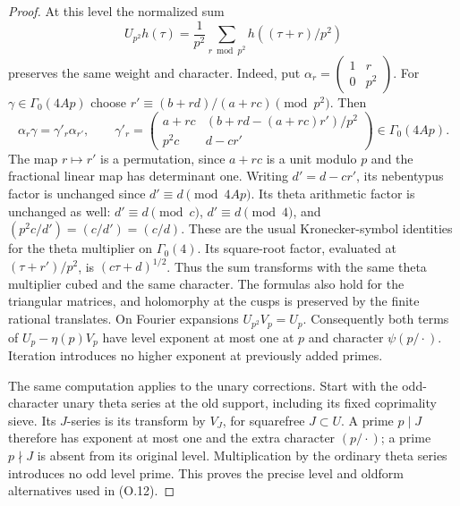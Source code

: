 \documentclass[11pt]{article}
\theoremstyle{definition}
\theoremstyle{remark}
\begin{document}
\begin{proof}
At this level the normalized sum
\[
 U_{p^2}h(\tau)=\frac1{p^2}\sum_{r\bmod p^2}
                             h((\tau+r)/p^2)
\]
preserves the same weight and character. Indeed, put
$\alpha_r=\left(\begin{smallmatrix}1&r\\0&p^2\end{smallmatrix}\right)$.
For $\gamma\in\Gamma_0(4Ap)$ choose
$r'\equiv(b+rd)/(a+rc)\pmod{p^2}$. Then
\[
 \alpha_r\gamma=\gamma'_r\alpha_{r'},\qquad
 \gamma'_r=
 \begin{pmatrix}
  a+rc&(b+rd-(a+rc)r')/p^2\\
  p^2c&d-cr'
 \end{pmatrix}\in\Gamma_0(4Ap).
\]
The map $r\mapsto r'$ is a permutation, since $a+rc$ is a unit
modulo $p$ and the fractional linear map has determinant one.
Writing $d'=d-cr'$, its nebentypus factor is unchanged since
$d'\equiv d\pmod{4Ap}$. Its theta arithmetic factor is unchanged
as well: $d'\equiv d\pmod c$, $d'\equiv d\pmod4$, and
$(p^2c/d')=(c/d')=(c/d)$. These are the usual Kronecker-symbol
identities for the theta multiplier on $\Gamma_0(4)$.
Its square-root factor, evaluated at $(\tau+r')/p^2$, is
$(c\tau+d)^{1/2}$. Thus the sum transforms with the same
theta multiplier cubed and the same character. The formulas also
hold for the triangular matrices, and holomorphy at the cusps is
preserved by the finite rational translates.
On Fourier expansions $U_{p^2}V_p=U_p$. Consequently both terms
of $U_p-\eta(p)V_p$ have level exponent at most one at $p$ and
character $\psi(p/\cdot)$. Iteration introduces no higher exponent
at previously added primes.

The same computation applies to the unary corrections. Start with
the odd-character unary theta series at the old support, including
its fixed coprimality sieve. Its $J$-series is its transform by
$V_J$, for squarefree $J\subset U$. A prime $p\mid J$ therefore
has exponent at most one and the extra character $(p/\cdot)$;
a prime $p\nmid J$ is absent from its original level. Multiplication
by the ordinary theta series introduces no odd level prime. This
proves the precise level and oldform alternatives used in (O.12).



\end{proof}
\end{document}
